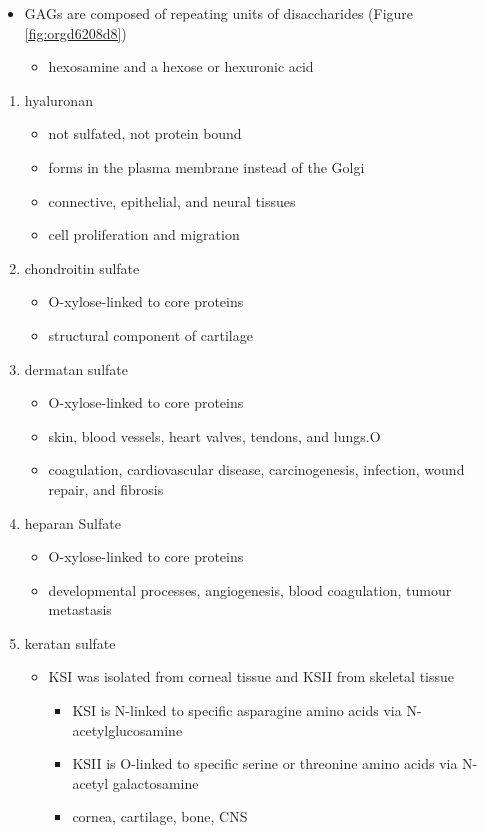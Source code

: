 \documentclass{scrartcl}
\begin{document}
\begin{itemize}
\item GAGs are composed of repeating units of disaccharides (Figure \ref{fig:orgd6208d8})
\begin{itemize}
\item hexosamine and a hexose or hexuronic acid
\end{itemize}
\end{itemize}
\begin{enumerate}
\item hyaluronan
\label{sec:orga5ef52d}
\begin{itemize}
\item not sulfated, not protein bound
\item forms in the plasma membrane instead of the Golgi
\item connective, epithelial, and neural tissues
\item cell proliferation and migration
\end{itemize}

\item chondroitin sulfate
\label{sec:orgc5d89e5}
\begin{itemize}
\item O-xylose-linked to core proteins
\item structural component of cartilage
\end{itemize}

\item dermatan sulfate
\label{sec:orgdf6d34e}
\begin{itemize}
\item O-xylose-linked to core proteins
\item skin, blood vessels, heart valves, tendons, and lungs.O
\item coagulation, cardiovascular disease, carcinogenesis, infection, wound repair, and fibrosis
\end{itemize}

\item heparan Sulfate
\label{sec:org2de9129}
\begin{itemize}
\item O-xylose-linked to core proteins
\item developmental processes, angiogenesis, blood coagulation, tumour metastasis
\end{itemize}

\item keratan sulfate
\label{sec:org3a0174b}
\begin{itemize}
\item KSI was isolated from corneal tissue and KSII from skeletal tissue
\begin{itemize}
\item KSI is N-linked to specific asparagine amino acids via
N-acetylglucosamine
\item KSII is O-linked to specific serine or threonine amino acids via
N-acetyl galactosamine
\item cornea, cartilage, bone, CNS
\end{itemize}
\end{itemize}



\end{enumerate}
\end{document}
